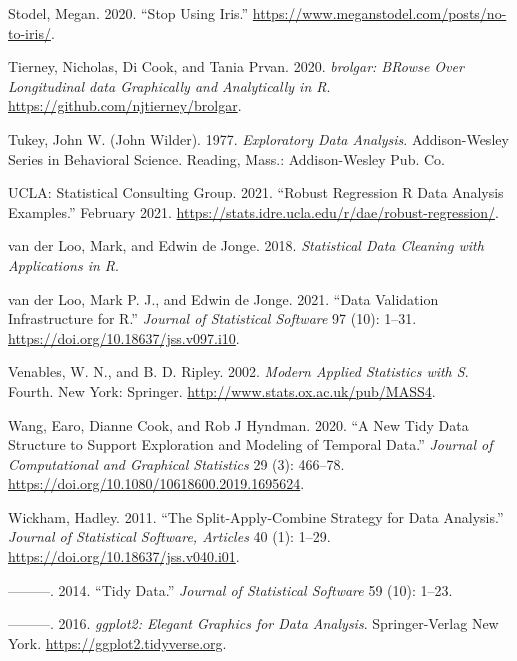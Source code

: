 \documentclass[12pt]{article}
\begin{document}
\leavevmode\hypertarget{ref-notiris}{}%
Stodel, Megan. 2020. ``Stop Using Iris.'' \url{https://www.meganstodel.com/posts/no-to-iris/}.

\leavevmode\hypertarget{ref-brolgar}{}%
Tierney, Nicholas, Di Cook, and Tania Prvan. 2020. \emph{brolgar: BRowse Over Longitudinal data Graphically and Analytically in R}. \url{https://github.com/njtierney/brolgar}.

\leavevmode\hypertarget{ref-tukey}{}%
Tukey, John W. (John Wilder). 1977. \emph{Exploratory Data Analysis}. Addison-Wesley Series in Behavioral Science. Reading, Mass.: Addison-Wesley Pub. Co.

\leavevmode\hypertarget{ref-rlm}{}%
UCLA: Statistical Consulting Group. 2021. ``Robust Regression \textbar{} R Data Analysis Examples.'' February 2021. \url{https://stats.idre.ucla.edu/r/dae/robust-regression/}.

\leavevmode\hypertarget{ref-LooMarkvander2018Sdcw}{}%
van der Loo, Mark, and Edwin de Jonge. 2018. \emph{Statistical Data Cleaning with Applications in R}.

\leavevmode\hypertarget{ref-validate}{}%
van der Loo, Mark P. J., and Edwin de Jonge. 2021. ``Data Validation Infrastructure for R.'' \emph{Journal of Statistical Software} 97 (10): 1--31. \url{https://doi.org/10.18637/jss.v097.i10}.

\leavevmode\hypertarget{ref-mass}{}%
Venables, W. N., and B. D. Ripley. 2002. \emph{Modern Applied Statistics with S}. Fourth. New York: Springer. \url{http://www.stats.ox.ac.uk/pub/MASS4}.

\leavevmode\hypertarget{ref-tsibble}{}%
Wang, Earo, Dianne Cook, and Rob J Hyndman. 2020. ``A New Tidy Data Structure to Support Exploration and Modeling of Temporal Data.'' \emph{Journal of Computational and Graphical Statistics} 29 (3): 466--78. \url{https://doi.org/10.1080/10618600.2019.1695624}.

\leavevmode\hypertarget{ref-plyr}{}%
Wickham, Hadley. 2011. ``The Split-Apply-Combine Strategy for Data Analysis.'' \emph{Journal of Statistical Software, Articles} 40 (1): 1--29. \url{https://doi.org/10.18637/jss.v040.i01}.

\leavevmode\hypertarget{ref-WickhamHadley2014TD}{}%
---------. 2014. ``Tidy Data.'' \emph{Journal of Statistical Software} 59 (10): 1--23.

\leavevmode\hypertarget{ref-ggplot2}{}%
---------. 2016. \emph{ggplot2: Elegant Graphics for Data Analysis}. Springer-Verlag New York. \url{https://ggplot2.tidyverse.org}.
\end{document}
